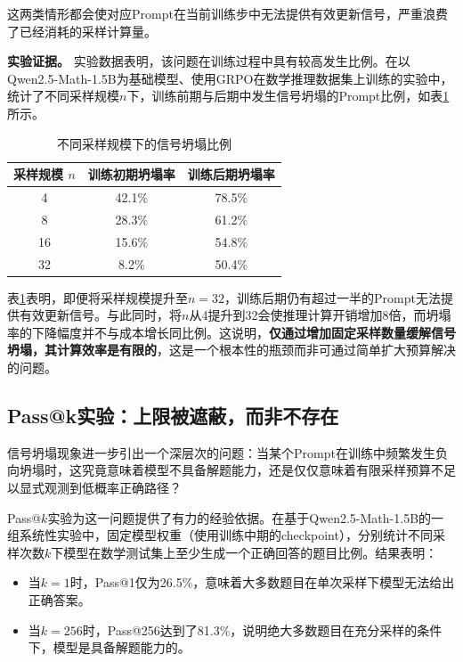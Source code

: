 这两类情形都会使对应Prompt在当前训练步中无法提供有效更新信号，严重浪费了已经消耗的采样计算量。

\textbf{实验证据。} 实验数据表明，该问题在训练过程中具有较高发生比例。在以Qwen2.5-Math-1.5B为基础模型、使用GRPO在数学推理数据集上训练的实验中，统计了不同采样规模$n$下，训练前期与后期中发生信号坍塌的Prompt比例，如表\ref{tab:signal_collapse_rate}所示。

\begin{table}[htbp]
    \centering
    \caption{不同采样规模下的信号坍塌比例}\label{tab:signal_collapse_rate}
    \begin{tabular}{|c|c|c|}
    \hline
    采样规模 $n$ & 训练初期坍塌率 & 训练后期坍塌率 \\
    \hline
    4 & 42.1\% & 78.5\% \\
    8 & 28.3\% & 61.2\% \\
    16 & 15.6\% & 54.8\% \\
    32 & 8.2\% & 50.4\% \\
    \hline
    \end{tabular}
\end{table}

表\ref{tab:signal_collapse_rate}表明，即便将采样规模提升至$n=32$，训练后期仍有超过一半的Prompt无法提供有效更新信号。与此同时，将$n$从4提升到32会使推理计算开销增加8倍，而坍塌率的下降幅度并不与成本增长同比例。这说明，\textbf{仅通过增加固定采样数量缓解信号坍塌，其计算效率是有限的}，这是一个根本性的瓶颈而非可通过简单扩大预算解决的问题。

\subsection{Pass@k实验：上限被遮蔽，而非不存在}
\label{subsec:pass_k_analysis}

信号坍塌现象进一步引出一个深层次的问题：当某个Prompt在训练中频繁发生负向坍塌时，这究竟意味着模型不具备解题能力，还是仅仅意味着有限采样预算不足以显式观测到低概率正确路径？

Pass@$k$实验为这一问题提供了有力的经验依据。在基于Qwen2.5-Math-1.5B的一组系统性实验中，固定模型权重（使用训练中期的checkpoint），分别统计不同采样次数$k$下模型在数学测试集上至少生成一个正确回答的题目比例。结果表明：

\begin{itemize}
    \item 当$k = 1$时，Pass@1仅为26.5\%，意味着大多数题目在单次采样下模型无法给出正确答案。
    \item 当$k = 256$时，Pass@256达到了81.3\%，说明绝大多数题目在充分采样的条件下，模型是具备解题能力的。
\end{itemize}

